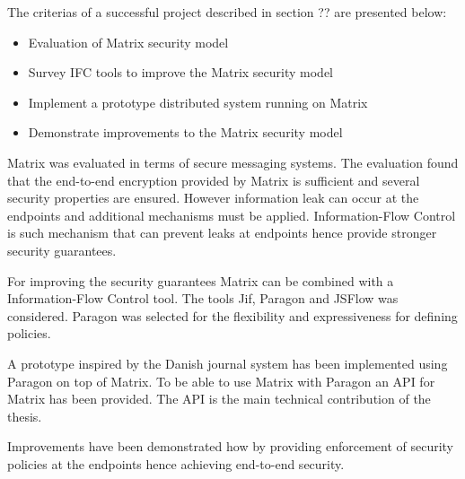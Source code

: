 
The criterias of a successful project described in section ?? are presented below:

\begin{itemize}
	\item Evaluation of Matrix security model
	\item Survey IFC tools to improve the Matrix security model
	\item Implement a prototype distributed system running on Matrix
	\item Demonstrate improvements to the Matrix security model
\end{itemize} 

Matrix was evaluated in terms of secure messaging systems. The evaluation found that the end-to-end encryption provided by Matrix is sufficient and several security properties are ensured. However information leak can occur at the endpoints and additional mechanisms must be applied. Information-Flow Control is such mechanism that can prevent leaks at endpoints hence provide stronger security guarantees.

For improving the security guarantees Matrix can be combined with a Information-Flow Control tool. The tools Jif, Paragon and JSFlow was considered.  Paragon was selected for the flexibility and expressiveness for defining policies.

A prototype inspired by the Danish journal system has been implemented using Paragon on top of Matrix. To be able to use Matrix with Paragon an API for Matrix has been provided. The API is the main technical contribution of the thesis. 

Improvements have been demonstrated how by providing enforcement of security policies at the endpoints hence achieving end-to-end security.



